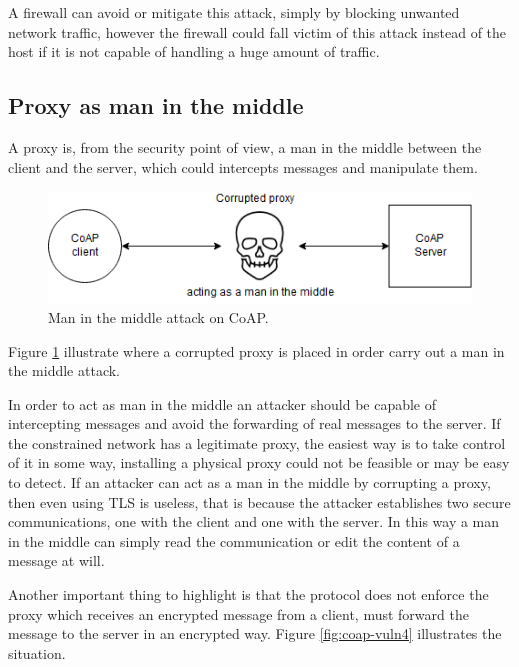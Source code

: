	A firewall can avoid or mitigate this attack, simply by blocking unwanted network traffic, however the firewall could fall victim of this attack instead of the host if it is not capable of handling a huge amount of traffic.\newline
	
	\subsection{Proxy as man in the middle}
	A proxy is, from the security point of view, a man in the middle between the client and the server, which could intercepts messages and manipulate them.
	
	\begin{figure}
		\includegraphics[width=\linewidth]{coap-vuln-img3.png}
		\caption{Man in the middle attack on CoAP.}
		\label{fig:coap-vuln3}
	\end{figure}
	
	Figure \ref{fig:coap-vuln3} illustrate where a corrupted proxy is placed in order carry out a man in the middle attack.\newline
	
	In order to act as man in the middle an attacker should be capable of intercepting messages and avoid the forwarding of real messages to the server.\newline
	If the constrained network has a legitimate proxy, the easiest way is to take control of it in some way, installing a physical proxy could not be feasible or may be easy to detect.\newline
	If an attacker can act as a man in the middle by corrupting a proxy, then even using TLS is useless, that is because the attacker establishes two secure communications, one with the client and one with the server.\newline
	In this way a man in the middle can simply read the communication or edit the content of a message at will.\newline
	
	Another important thing to highlight is that the protocol does not enforce the proxy which receives an encrypted message from a client, must forward the message to the server in an encrypted way.
	Figure \ref{fig:coap-vuln4} illustrates the situation.\newline
	
